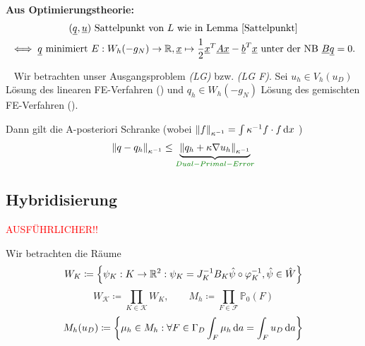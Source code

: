 \textbf{Aus Optimierungstheorie:} 
\begin{gather*}
	(\underline{q}, \underline{u}) \text{ Sattelpunkt von } L  \text { wie in Lemma \ref{Sattelpunkt}}\\
	\iff \underline{q} \text{ minimiert } E:W_h(-g_N) \to \mathbb{R} , \underline{x} \mapsto \frac{1}{2} \underline{x}^T \underline{A} \underline{x} - \underline{b}^T \underline{x} \text{ unter der NB } \underline{B} \underline{q} = 0.
\end{gather*}

\begin{Satz} ~\newline
	Wir betrachten unser Ausgangsproblem \emph{(LG)} bzw. \emph{(LG F)}. Sei $ u_h \in V_h(u_D) $ Lösung des linearen FE-Verfahren () und $ q_h \in W_h(-g_N) $ Lösung des gemischten FE-Verfahren (). 
	
	Dann gilt die A-posteriori Schranke (wobei  $ \norm{f}_{\kappa^{-1}} = \int \kappa^{-1} f \cdot f \mathop{}\!\mathrm{d} x $ ) 
	\begin{gather*}
	\norm{q-q_h}_{\kappa^{-1}} \leq \underbrace{\norm{q_h + \kappa \nabla u_h}_{\kappa^{-1}}}_{\defi{Dual-Primal-Error}} 
	\end{gather*}
\end{Satz}


\subsection{Hybridisierung}

\textcolor{red}{AUSFÜHRLICHER!!}


Wir betrachten die Räume
	\[W_K \coloneqq \left\{ \psi_K:K \to \mathbb{R}^2: \psi_K = J_K^{-1}  B_K \hat{\psi} \circ \varphi_K^{-1}, \hat{\psi} \in \hat{W} \right\} \]
\[ W_\mathcal{K} \coloneqq \prod_{K \in \mathcal{K}} W_K, \qquad M_h \coloneqq \prod_{F \in \mathcal{F}} \mathbb{P}_0(F) \]
\[ M_h(u_D) \coloneqq \left\{ \mu_h \in M_h:\forall  F \in \Gamma_D \int_F \mu_h \mathop{}\!\mathrm{d} a = \int_F u_D \mathop{}\!\mathrm{d} a  \right\}\]

